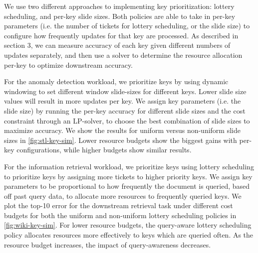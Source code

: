 We use two different approaches to implementing key prioritization: lottery scheduling, and per-key slide sizes. Both policies are able to take in per-key parameters (i.e. the number of tickets for lottery scheduling, or the slide size) to configure how frequently updates for that key are processed. As described in section 3, we can measure accuracy of each key given different numbers of updates separately, and then use a solver to determine the resource allocation per-key to optimize downstream accuracy.


For the anomaly detection workload, we prioritize keys by using dynamic windowing to set different window slide-sizes for different keys. Lower slide size values will result in more updates per key. We assign key parameters (i.e. the slide size) by running the per-key accuracy for different slide sizes and the cost constraint through an LP-solver, to choose the best combination of slide sizes to maximize accuracy. We show the results for uniform versus non-uniform slide sizes in \cref{fig:stl-key-sim}. Lower resource budgets show the biggest gains with per-key configurations, while higher budgets show similar results. 


For the information retrieval workload, we prioritize keys using lottery scheduling \cite{waldspurger1994lottery} to prioritize keys by assigning more tickets to higher priority keys. We assign key parameters to be proportional to how frequently the document is queried, based off past query data, to allocate more resources to frequently queried keys. We plot the top-10 error for the downstream retrieval task under different cost budgets for both the uniform and non-uniform lottery scheduling policies in \cref{fig:wiki-key-sim}. For lower resource budgets, the query-aware lottery scheduling policy allocates resources more effectively to keys which are queried often. As the resource budget increases, the impact of query-awareness decreases. 




